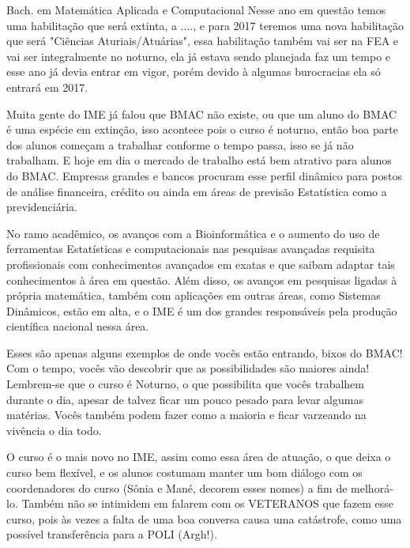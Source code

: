 \begin{subsecao}{Bach. em Matemática Aplicada e Computacional}
Nesse ano em questão temos uma habilitação que será extinta, a ....,
e para 2017 teremos uma nova habilitação que será "Ciências Aturiais/Atuárias",
essa habilitação também vai ser na FEA e vai ser integralmente no noturno,
ela já estava sendo planejada faz um tempo e esse ano já devia entrar em vigor,
porém devido à algumas burocracias ela só entrará em 2017.

Muita gente do IME já falou que BMAC não existe, ou que um aluno do BMAC é uma
espécie em extinção, isso acontece pois o curso é noturno, então boa parte
dos alunos começam a trabalhar conforme o tempo passa, isso se já não trabalham.
E hoje em dia o mercado de trabalho está bem atrativo para alunos do BMAC.
Empresas grandes e bancos procuram esse perfil dinâmico para postos de análise
financeira, crédito ou ainda em áreas de previsão Estatística como a
previdenciária.

No ramo acadêmico, os avanços com a Bioinformática e o aumento do uso de
ferramentas Estatísticas e computacionais nas pesquisas avançadas requisita
profissionais com conhecimentos avançados em exatas e que saibam adaptar tais
conhecimentos à área em questão. Além disso, os avanços em pesquisas ligadas à
própria matemática, também com aplicações em outras áreas, como Sistemas
Dinâmicos, estão em alta, e o IME é um dos grandes responsáveis pela produção
científica nacional nessa área.

Esses são apenas alguns exemplos de onde vocês estão entrando, bixos do BMAC! Com o tempo,
vocês vão descobrir que as possibilidades são maiores ainda! Lembrem-se que o
curso é Noturno, o que possibilita que vocês trabalhem durante o dia, apesar de talvez
ficar um pouco pesado para levar algumas matérias. Vocês também podem fazer como
a maioria e ficar varzeando na vivência o dia todo.

O curso é o mais novo no IME, assim como essa área de atuação, o que
deixa o curso bem flexível, e os alunos costumam manter um bom diálogo
com os coordenadores do curso (Sônia e Mané, decorem esses nomes) a fim de melhorá-lo.
Também não se intimidem em falarem com os VETERANOS que fazem esse curso, pois às
vezes a falta de uma boa conversa causa uma catástrofe, como uma possível
transferência para a POLI (Argh!).

\end{subsecao}
